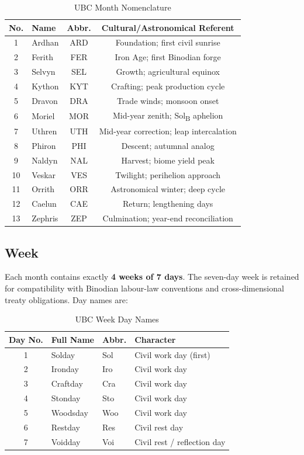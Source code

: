 \documentclass[journal,twoside]{IEEEtran}
\begin{document}
\begin{table}[!t]
\centering
\caption{UBC Month Nomenclature}
\label{tab:months}
\begin{tabular}{@{}clcc@{}}
\toprule
\textbf{No.} & \textbf{Name} & \textbf{Abbr.} & \textbf{Cultural/Astronomical Referent} \\
\midrule
 1  & Ardhan    & ARD & Foundation; first civil sunrise \\
 2  & Ferith    & FER & Iron Age; first Binodian forge \\
 3  & Selvyn    & SEL & Growth; agricultural equinox \\
 4  & Kython    & KYT & Crafting; peak production cycle \\
 5  & Dravon    & DRA & Trade winds; monsoon onset \\
 6  & Moriel    & MOR & Mid-year zenith; Sol\textsubscript{B} aphelion \\
 7  & Uthren    & UTH & Mid-year correction; leap intercalation \\
 8  & Phiron    & PHI & Descent; autumnal analog \\
 9  & Naldyn    & NAL & Harvest; biome yield peak \\
10  & Veskar    & VES & Twilight; perihelion approach \\
11  & Orrith    & ORR & Astronomical winter; deep cycle \\
12  & Caelun    & CAE & Return; lengthening days \\
13  & Zephris   & ZEP & Culmination; year-end reconciliation \\
\bottomrule
\end{tabular}
\end{table}

\subsection{Week}
\label{sec:calendar_week}

Each month contains exactly \textbf{4 weeks of 7 days}.  The seven-day week is retained
for compatibility with Binodian labour-law conventions and cross-dimensional treaty
obligations.  Day names are:

\begin{table}[!t]
\centering
\caption{UBC Week Day Names}
\label{tab:days}
\begin{tabular}{@{}clll@{}}
\toprule
\textbf{Day No.} & \textbf{Full Name} & \textbf{Abbr.} & \textbf{Character} \\
\midrule
1 & Solday    & Sol & Civil work day (first) \\
2 & Ironday   & Iro & Civil work day \\
3 & Craftday  & Cra & Civil work day \\
4 & Stonday   & Sto & Civil work day \\
5 & Woodsday  & Woo & Civil work day \\
6 & Restday   & Res & Civil rest day \\
7 & Voidday   & Voi & Civil rest / reflection day \\
\bottomrule
\end{tabular}
\end{table}
\end{document}
